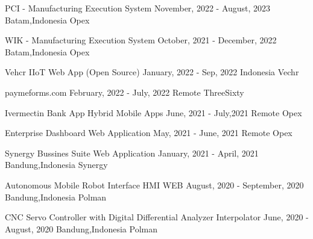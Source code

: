 
\begin{cvhonors}

  \cvhonor
    {PCI - Manufacturing Execution System} %
    {November, 2022 - August, 2023} %
    {Batam,Indonesia} %
    {Opex} %

  \cvhonor
    {WIK - Manufacturing Execution System} %
    {October, 2021 - December, 2022} %
    {Batam,Indonesia} %
    {Opex} %

  \cvhonor
    {Vehcr IIoT Web App (Open Source)} %
    {January, 2022 - Sep, 2022} %
    {Indonesia} %
    {Vechr} %

  \cvhonor
    {paymeforms.com} %
    {February, 2022 - July, 2022} %
    {Remote} %
    {ThreeSixty} %

  \cvhonor
    {Ivermectin Bank App Hybrid Mobile Apps} %
    {June, 2021 - July,2021} %
    {Remote} %
    {Opex} %

  \cvhonor
    {Enterprise Dashboard Web Application} %
    {May, 2021 - June, 2021} %
    {Remote} %
    {Opex} %
    
  \cvhonor
    {Synergy Bussines Suite Web Application} %
    {January, 2021 - April, 2021} %
    {Bandung,Indonesia} %
    {Synergy} %

  \cvhonor
    {Autonomous Mobile Robot Interface HMI WEB} %
    {August, 2020 - September, 2020} %
    {Bandung,Indonesia} %
    {Polman} %

  \cvhonor
    {CNC Servo Controller with Digital Differential Analyzer Interpolator} %
    {June, 2020 - August, 2020} %
    {Bandung,Indonesia} %
    {Polman} %


\end{cvhonors}
